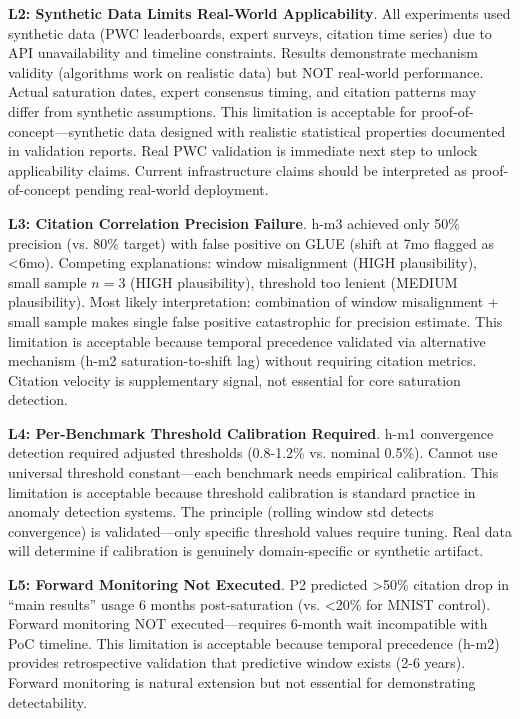 \textbf{L2: Synthetic Data Limits Real-World Applicability}. All experiments used synthetic data (PWC leaderboards, expert surveys, citation time series) due to API unavailability and timeline constraints. Results demonstrate mechanism validity (algorithms work on realistic data) but NOT real-world performance. Actual saturation dates, expert consensus timing, and citation patterns may differ from synthetic assumptions. This limitation is acceptable for proof-of-concept---synthetic data designed with realistic statistical properties documented in validation reports. Real PWC validation is immediate next step to unlock applicability claims. Current infrastructure claims should be interpreted as proof-of-concept pending real-world deployment.

\textbf{L3: Citation Correlation Precision Failure}. h-m3 achieved only 50\% precision (vs. 80\% target) with false positive on GLUE (shift at 7mo flagged as <6mo). Competing explanations: window misalignment (HIGH plausibility), small sample $n=3$ (HIGH plausibility), threshold too lenient (MEDIUM plausibility). Most likely interpretation: combination of window misalignment + small sample makes single false positive catastrophic for precision estimate. This limitation is acceptable because temporal precedence validated via alternative mechanism (h-m2 saturation-to-shift lag) without requiring citation metrics. Citation velocity is supplementary signal, not essential for core saturation detection.

\textbf{L4: Per-Benchmark Threshold Calibration Required}. h-m1 convergence detection required adjusted thresholds (0.8-1.2\% vs. nominal 0.5\%). Cannot use universal threshold constant---each benchmark needs empirical calibration. This limitation is acceptable because threshold calibration is standard practice in anomaly detection systems. The principle (rolling window std detects convergence) is validated---only specific threshold values require tuning. Real data will determine if calibration is genuinely domain-specific or synthetic artifact.

\textbf{L5: Forward Monitoring Not Executed}. P2 predicted >50\% citation drop in ``main results'' usage 6 months post-saturation (vs. <20\% for MNIST control). Forward monitoring NOT executed---requires 6-month wait incompatible with PoC timeline. This limitation is acceptable because temporal precedence (h-m2) provides retrospective validation that predictive window exists (2-6 years). Forward monitoring is natural extension but not essential for demonstrating detectability.

